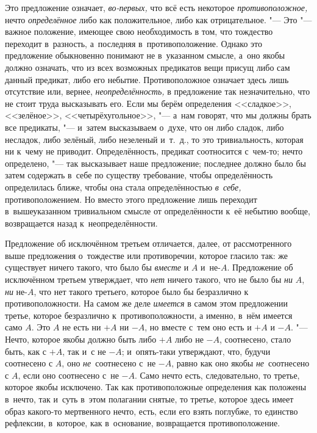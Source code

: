 Это предложение означает, {\em во-первых,} что всё есть
некоторое {\em противоположное,} нечто
{\em определённое} либо как положительное, либо как
отрицательное. "--- Это "--- важное положение, имеющее свою необходимость в
том, что тождество переходит в~разность, а~последняя в~противоположение.
Однако это предложение обыкновенно понимают не в~указанном смысле, а~оно якобы
должно означать, что из всех возможных предикатов вещи присущ либо сам
данный предикат, либо его небытие. Противоположное означает здесь лишь
отсутствие или, вернее, {\em неопределённость,} в
предложение так незначительно, что не стоит труда высказывать его. Если мы
берём определения <<сладкое>>, <<зелёное>>, <<четырёхугольное>>, "--- а~нам
говорят, что мы должны брать все предикаты, "--- и~затем высказываем о~духе,
что он либо сладок, либо несладок, либо зелёный, либо незеленый и~т.~д., то
это тривиальность, которая ни к~чему не приводит. Определённость, предикат
соотносится с~чем-то; нечто определено, "--- так высказывает наше предложение;
последнее должно было бы затем содержать в~себе по существу требование,
чтобы определённость определилась ближе, чтобы она стала определённостью
{\em в~себе,} противоположением. Но вместо этого
предложение лишь переходит в~вышеуказанном тривиальном смысле от
определённости к~её небытию вообще, возвращается назад к~неопределённости.

Предложение об исключённом третьем отличается, далее, от рассмотренного выше
предложения о~тождестве или противоречии, которое гласило так: же
существует ничего такого, что было бы {\em вместе} и
$A$ и~не-$A$. Предложение об исключённом третьем утверждает,
что {\em нет} ничего такого, что не было бы {\em ни} $A$, {\em ни} не-$A$,
что нет такого третьего, которое было бы безразлично к
противоположности. На самом же деле {\em имеется} в
самом этом предложении третье, которое безразлично к~противоположности, а
именно, в~нём имеется само $A$. Это $A$ не есть ни
$+A$ ни $-A$, но вместе с~тем оно есть и $+A$ и
$-A$. "--- Нечто, которое якобы должно быть либо $+A$ либо
не $-A$, соотнесено, стало быть, как с $+A$, так и~с
не $-A$; и~опять-таки утверждают, что, будучи соотнесено с
$A$, оно {\em не}~соотнесено с~не $-A$,
равно как оно якобы {\em не}~соотнесено с $A$,
если оно соотнесено с~не $-A$. Само нечто есть, следовательно, то
третье, которое якобы исключено. Так как противоположные определения как
положены в~нечто, так и~суть в~этом полагании снятые, то третье, которое
здесь имеет образ какого-то мертвенного нечто, есть, если его взять
поглубже, то единство рефлексии, в~которое, как в~основание, возвращается
противоположение.

